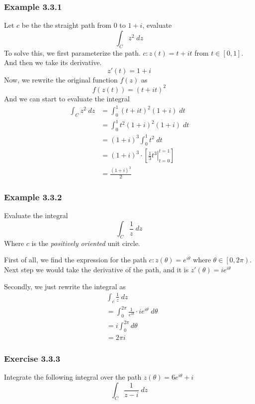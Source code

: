 \documentclass[12pt]{book}
\newcommand{\sqbkt}[1]{\left[ #1 \right]}
\newcommand{\paren}[1]{\left( #1 \right)}
\newcommand{\closeopen}[1]{\left[ #1 \right)}
\begin{document}
\subsubsection{Example 3.3.1}
Let $c$ be the the straight path from $0$ to $1+i$, evaluate
\[
\int_C z^2 \; dz
\]
To solve this, we first parameterize the path. $c \colon z(t) = t + it$ from $t \in \sqbkt{0,1}$. And then we take its derivative.
\[
z'(t) = 1+i
\]
Now, we rewrite the original function $f(z)$ as
\[
f\paren{z(t)} = \paren{t+it}^2
\]
And we can start to evaluate the integral
\begin{align*}
   \int_C z^2 \; dz &= \int_{0}^{1} \paren{t+it}^2\paren{1+i}\;dt\\
                     &= \int_{0}^{1} t^2\paren{1+i}^2\paren{1+i}\;dt \\
                     &= \paren{1+i}^3 \int_{0}^{1} t^2 \; dt\\
                     &= \paren{1+i}^3 \cdot \sqbkt{\left.\frac{1}{3}t^3 \right|_{t=0}^{t=1}}\\
                     &= \frac{\paren{1+i}^3}{2}
\end{align*}

\subsubsection{Example 3.3.2}
Evaluate the integral
\[
\int_C \frac{1}{z}\;dz
\]
Where $c$ is the \textit{positively oriented} unit circle. 

First of all, we find the expression for the path $c \colon z(\theta) = e^{i\theta}$ where $\theta\in\closeopen{0,2\pi}$. Next step we would take the derivative of the path, and it is $z'(\theta) = ie^{i\theta}$

Secondly, we just rewrite the integral as
\begin{align}
   &\int_c \frac{1}{z} \; dz \\
   &= \int_{0}^{2\pi} \frac{1}{e^{i\theta}}\cdot ie^{i\theta} \; d\theta \\
   &= i\int_{0}^{2\pi}  d\theta\\
   &= 2\pi i
\end{align}

\subsubsection{Exercise 3.3.3}
Integrate the following integral over the path $z(\theta) = 6e^{i\theta}+i$
\[
\int_C \frac{1}{z-i} \; dz
\]
\end{document}
